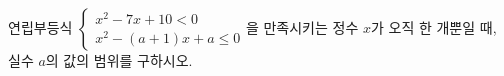 연립부등식 $\begin{cases} x^2-7x+10<0 \\ x^2-(a+1)x+a\le 0 \end{cases}$을 만족시키는 정수 $x$가 오직 한 개뿐일 때, 실수 $a$의 값의 범위를 구하시오.
